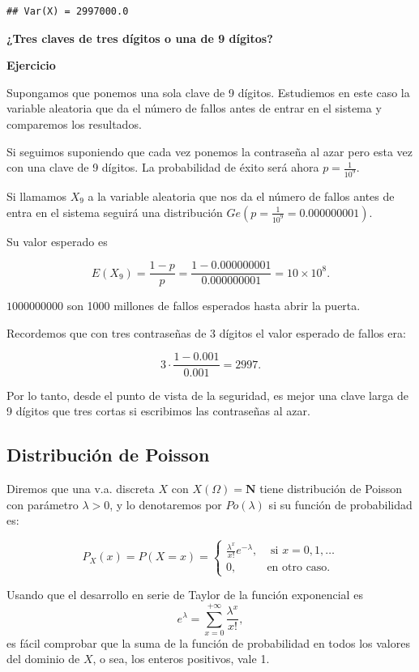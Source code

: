 \documentclass[]{book}
\begin{document}
\begin{verbatim}
## Var(X) = 2997000.0
\end{verbatim}

\textbf{¿Tres claves de tres dígitos o una de 9 dígitos?}

\textbf{Ejercicio}

Supongamos que ponemos una sola clave de 9 dígitos. Estudiemos en este caso la variable aleatoria que da el número de fallos antes de entrar en el sistema y comparemos los resultados.

Si seguimos suponiendo que cada vez ponemos la contraseña al azar pero esta vez con una clave de 9 dígitos. La probabilidad de éxito será ahora \(p=\frac{1}{10^{9}}\).

Si llamamos \(X_9\) a la variable aleatoria que nos da el número de fallos antes de entra en el sistema seguirá una distribución \(Ge(p=\frac{1}{10^9}=0.000000001)\).

Su valor esperado es

\[
E(X_9)=\frac{1-p}{p}=\frac{1-0.000000001}{0.000000001}=\ensuremath{10\times 10^{8}}.
\]

\(1000 000 000\) son 1000 millones de fallos esperados hasta abrir la puerta.

Recordemos que con tres contraseñas de 3 dígitos el valor esperado de fallos era:

\[3\cdot \frac{1-0.001}{0.001}=2997.\]

Por lo tanto, desde el punto de vista de la seguridad, es mejor una clave larga de 9 dígitos que tres cortas si escribimos las contraseñas al azar.

\hypertarget{distribuciuxf3n-de-poisson}{%
\subsection{Distribución de Poisson}\label{distribuciuxf3n-de-poisson}}

Diremos que una v.a. discreta \(X\) con \(X(\Omega)=\mathbf{N}\) tiene distribución de Poisson con parámetro \(\lambda>0\), y lo denotaremos por \(Po(\lambda)\) si su función de probabilidad es:

\[
P_{X}(x)=P(X=x)=
\left\{\begin{array}{ll}
\frac{\lambda^x}{x!} e^{-\lambda},& \mbox{ si } x=0,1,\ldots\\
0, & \mbox{en otro caso.}\end{array}\right.
\]

Usando que el desarrollo en serie de Taylor de la función exponencial es
\[
e^{\lambda}=\sum_{x=0}^{+\infty} \frac{\lambda^x}{x!},
\]
es fácil comprobar que la suma de la función de probabilidad en todos los valores del dominio de \(X\), o sea, los enteros positivos, vale 1.
\end{document}
